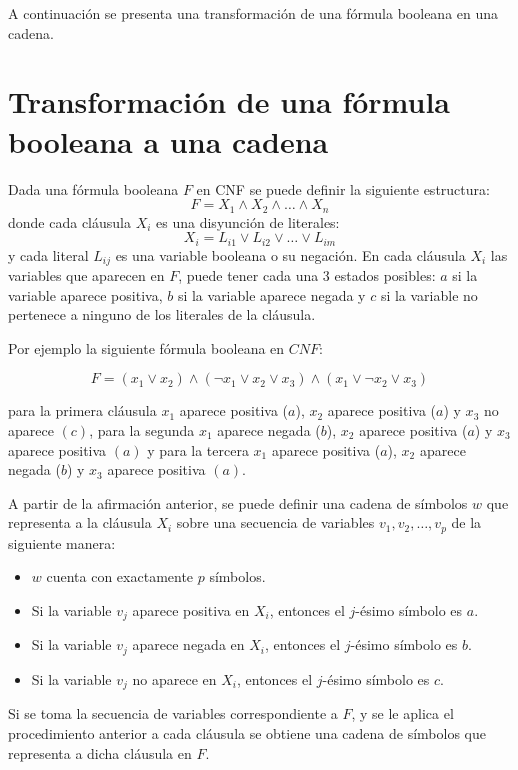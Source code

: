 \documentclass[12pt]{article}
\begin{document}
A continuación se presenta una transformación de una fórmula booleana en una cadena.

\section{Transformación de una fórmula booleana a una cadena}

Dada una fórmula booleana $F$ en CNF se puede definir la siguiente estructura:
$$F=X_1 \wedge X_2 \wedge \ldots \wedge X_n$$
donde cada cláusula $X_i$ es una disyunción de literales:
$$X_i=L_{i1} \vee L_{i2} \vee \ldots \vee L_{im}$$
y cada literal $L_{ij}$ es una variable booleana o su negación. En cada cláusula $X_i$ las variables que aparecen en $F$, puede tener cada una 3 estados posibles: $a$ si la variable aparece positiva, $b$ si la variable aparece negada y $c$ si la variable no pertenece a ninguno de los literales de la cláusula.

Por ejemplo la siguiente fórmula booleana en $CNF$:

$$F=(x_1 \vee x_2) \wedge (\neg x_1 \vee x_2 \vee x_3) \wedge (x_1 \vee \neg x_2 \vee x_3)$$

para la primera cláusula $x_1$ aparece positiva ($a$), $x_2$ aparece positiva ($a$) y $x_3$ no aparece $(c)$, para la segunda
$x_1$ aparece negada ($b$), $x_2$ aparece positiva ($a$) y $x_3$ aparece positiva $(a)$ y para la tercera 
$x_1$ aparece positiva ($a$), $x_2$ aparece negada ($b$) y $x_3$ aparece positiva $(a)$.

A partir de la afirmación anterior, se puede definir una cadena de símbolos $w$ que representa a la cláusula $X_i$ sobre una secuencia de variables $v_1,v_2,\ldots,v_p$ de la siguiente manera:

\begin{itemize}
    \item $w$ cuenta con exactamente $p$ símbolos.
    \item Si la variable $v_j$ aparece positiva en $X_i$, entonces el $j$-ésimo símbolo es $a$.
    \item Si la variable $v_j$ aparece negada en $X_i$, entonces el $j$-ésimo símbolo es $b$.
    \item Si la variable $v_j$ no aparece en $X_i$, entonces el $j$-ésimo símbolo es $c$.
\end{itemize}
Si se toma la secuencia de variables correspondiente a $F$, y se le aplica el procedimiento anterior a cada cláusula
se obtiene una cadena de símbolos que representa a dicha cláusula en $F$.
\end{document}
